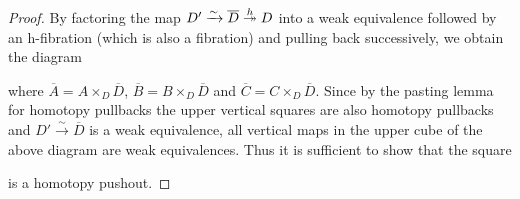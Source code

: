 \begin{prop}
\begin{proof}
        By factoring the map $D'\xrightarrow{\sim}\overline{D}\xtwoheadrightarrow{h} D$ into a weak equivalence followed by an h-fibration (which is also a fibration) and pulling back successively, we obtain the diagram
        \begin{center}
        \end{center}
        where $\overline{A}=A\times_{D}\overline{D}$, $\overline{B}=B\times_{D}\overline{D}$ and $\overline{C}=C\times_{D}\overline{D}$.
        Since by the pasting lemma for homotopy pullbacks the upper vertical squares are also homotopy pullbacks and $D'\xrightarrow{\sim}\overline{D}$ is a weak equivalence, all vertical maps in the upper cube of the above diagram are weak equivalences.
        Thus it is sufficient to show that the square
        \begin{center}
        \end{center}
        is a homotopy pushout.


\end{proof}
\end{prop}
